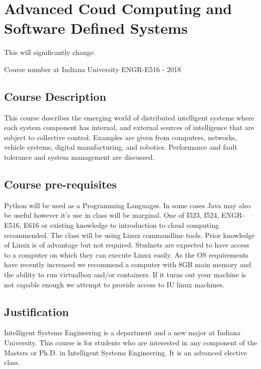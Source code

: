 \CHANGE
\FILENAME

\section{Advanced Coud Computing and Software Defined Systems}


This will significantly change.

Course number at Indiana University ENGR-E516 - 2018

\subsection{Course Description}

This course describes the emerging world of distributed intelligent
systems where each system component has internal, and external sources
of intelligence that are subject to collective control. Examples are
given from computers, networks, vehicle systems, digital
manufacturing, and robotics. Performance and fault tolerance and
system management are discussed.

\subsection{Course pre-requisites}

Python will be used as a Programming Languages. In some cases Java may
also be useful however it's use in class will be marginal. One of
I523, I524, ENGR-E516, E616 or existing knowledge to introduction to
cloud computing recommended. The class will be using Linux commandline
tools. Prior knowledge of Linux is of advantage but not required.
Studnets are expected to have access to a computer on which they can
execute Linux easily. As the OS requirements have recently increased
we recommend a computer with 8GB main memory and the ability to run
virtualbox and/or containers. If it turns out your machine is not
capable enough we attempt to provide access to IU linux machines.

\subsection{Justification}

Intelligent Systems Engineering is a department and a new major at
Indiana University. This course is for students who are interested in
any component of the Masters or Ph.D. in Intelligent Systems
Engineering. It is an advanced elective class.

